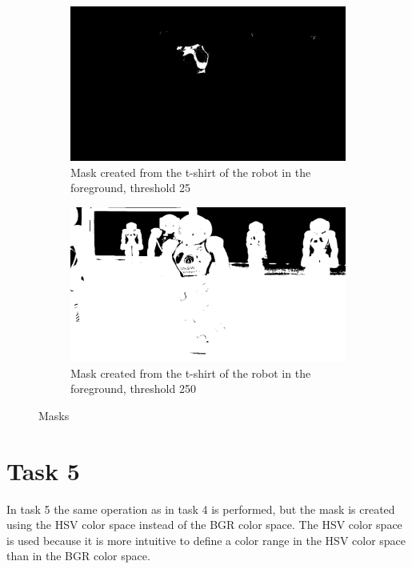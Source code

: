 \documentclass{article}
\begin{document}
\begin{figure}[H]
	\begin{subfigure}{0.4\textwidth}
		\includegraphics[width=\textwidth]{robocup_maskBGR25shirt.jpg}
		\caption{Mask created from the t-shirt of the robot in the foreground, threshold 25}
		\label{fig:maskBGR25shirt}
	\end{subfigure}
	\hfill
	\begin{subfigure}{0.4\textwidth}
		\includegraphics[width=\textwidth]{robocup_maskBGR250shirt.jpg}
		\caption{Mask created from the t-shirt of the robot in the foreground, threshold 250}
		\label{fig:maskBGR250shirt}
	\end{subfigure}
	\caption{Masks}
	\label{fig:maskBGR}
\end{figure}


\section*{Task 5}
In task 5 the same operation as in task 4 is performed, but the mask is created using the HSV color space instead of the BGR color space. The HSV color space is used because it is more intuitive to define a color range in the HSV color space than in the BGR color space.
\end{document}
